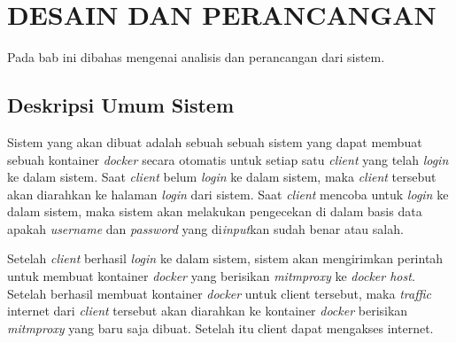 \chapter{DESAIN DAN PERANCANGAN}
Pada bab ini dibahas mengenai analisis dan perancangan dari sistem. 
\section{Deskripsi Umum Sistem}    
Sistem yang akan dibuat adalah sebuah sebuah sistem yang dapat membuat sebuah kontainer \textit{docker} secara otomatis untuk setiap satu \textit{client} yang telah \textit{login} ke dalam sistem. Saat \textit{client} belum \textit{login} ke dalam sistem, maka \textit{client} tersebut akan diarahkan ke halaman \textit{login} dari sistem. Saat \textit{client} mencoba untuk \textit{login} ke dalam sistem, maka sistem akan melakukan pengecekan di dalam basis data apakah \textit{username} dan \textit{password} yang di\textit{input}kan sudah benar atau salah. 

Setelah \textit{client} berhasil \textit{login} ke dalam sistem, sistem akan mengirimkan perintah untuk membuat kontainer \textit{docker} yang berisikan \textit{mitmproxy} ke \textit{docker host}. Setelah berhasil membuat kontainer \textit{docker} untuk client tersebut, maka \textit{traffic} internet dari \textit{client} tersebut akan diarahkan ke kontainer \textit{docker} berisikan \textit{mitmproxy} yang baru saja dibuat. Setelah itu client dapat mengakses internet.

